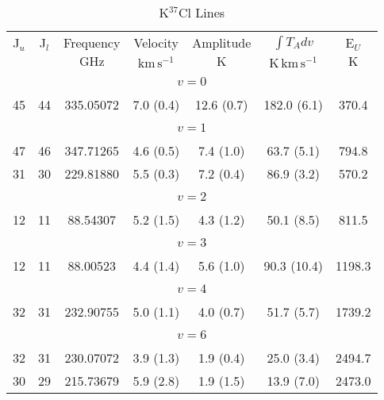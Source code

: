 \begin{table*}[htp]
\centering
\caption{K$^{37}$Cl Lines}
\begin{tabular}{ccccccc}
\label{tab:K37Cl_salt_lines}
 J$_u$ & J$_l$ & Frequency & Velocity & Amplitude & $\int T_A dv$ & E$_U$ \\
  &  & $\mathrm{GHz}$ & $\mathrm{km\,s^{-1}}$ & $\mathrm{K}$ & $\mathrm{K\,km\,s^{-1}}$ & $\mathrm{K}$ \\
\hline
&\vspace{-0.75em}\\
\multicolumn{7}{c}{$v = 0$} \\
\vspace{-0.75em}\\
 45 & 44 & 335.05072 & 7.0 (0.4) & 12.6 (0.7) & 182.0 (6.1) & 370.4 \\
&\vspace{-0.75em}\\
\multicolumn{7}{c}{$v = 1$} \\
\vspace{-0.75em}\\
 47 & 46 & 347.71265 & 4.6 (0.5) & 7.4 (1.0) & 63.7 (5.1) & 794.8 \\
 31 & 30 & 229.81880 & 5.5 (0.3) & 7.2 (0.4) & 86.9 (3.2) & 570.2 \\
&\vspace{-0.75em}\\
\multicolumn{7}{c}{$v = 2$} \\
\vspace{-0.75em}\\
 12 & 11 & 88.54307 & 5.2 (1.5) & 4.3 (1.2) & 50.1 (8.5) & 811.5 \\
&\vspace{-0.75em}\\
\multicolumn{7}{c}{$v = 3$} \\
\vspace{-0.75em}\\
 12 & 11 & 88.00523 & 4.4 (1.4) & 5.6 (1.0) & 90.3 (10.4) & 1198.3 \\
&\vspace{-0.75em}\\
\multicolumn{7}{c}{$v = 4$} \\
\vspace{-0.75em}\\
 32 & 31 & 232.90755 & 5.0 (1.1) & 4.0 (0.7) & 51.7 (5.7) & 1739.2 \\
&\vspace{-0.75em}\\
\multicolumn{7}{c}{$v = 6$} \\
\vspace{-0.75em}\\
 32 & 31 & 230.07072 & 3.9 (1.3) & 1.9 (0.4) & 25.0 (3.4) & 2494.7 \\
 30 & 29 & 215.73679 & 5.9 (2.8) & 1.9 (1.5) & 13.9 (7.0) & 2473.0 \\
\hline
\end{tabular}

\par 
\end{table*}
